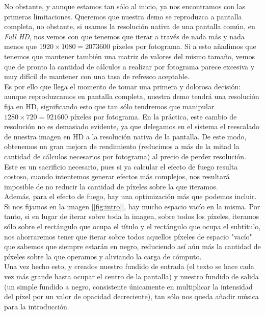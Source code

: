 No obstante, y aunque estamos tan sólo al inicio, ya nos encontramos con las primeras limitaciones. Queremos que nuestra demo se reproduzca a pantalla completa, no obstante, si usamos la resolución nativa de una pantalla común, en \emph{Full HD}, nos vemos con que tenemos que iterar a través de nada más y nada menos que \(1920 \times 1080 = 2073600\) píxeles por fotograma. Si a esto añadimos que tenemos que mantener también una matriz de valores del mismo tamaño, vemos que de pronto la cantidad de cálculos a realizar por fotograma parece excesiva y muy difícil de mantener con una tasa de refresco aceptable.\\

Es por ello que llega el momento de tomar una primera y dolorosa decisión: aunque reproduzcamos en pantalla completa, nuestra demo tendrá una resolución fija en HD, significando esto que tan sólo tendremos que manipular \(1280 \times 720 = 921600\) píxeles por fotograma. En la práctica, este cambio de resolución no es demasiado evidente, ya que delegamos en el sistema el reescalado de nuestra imagen en HD a la resolución nativa de la pantalla. De este modo, obtenemos un gran mejora de rendimiento (reducimos a más de la mitad la cantidad de cálculos necesarios por fotograma) al precio de perder resolución.\\

Este es un sacrificio necesario, pues si ya calcular el efecto de fuego resulta costoso, cuando intentemos generar efectos más complejos, nos resultará imposible de no reducir la cantidad de píxeles sobre la que iteramos.\\

Además, para el efecto de fuego, hay una optimización más que podemos incluir. Si nos fijamos en la imagen [\ref{fig:intro}], hay mucho espacio vacío en la misma. Por tanto, si en lugar de iterar sobre toda la imagen, sobre todos los píxeles, iteramos sólo sobre el rectángulo que ocupa el título y el rectángulo que ocupa el subtítulo, nos ahorraremos tener que iterar sobre todos aquellos píxeles de espacio "vacío" que sabemos que siempre estarán en negro, reduciendo así aún más la cantidad de píxeles sobre la que operamos y aliviando la carga de cómputo.\\

Una vez hecho esto, y creados nuestro fundido de entrada (el texto se hace cada vez más grande hasta ocupar el centro de la pantalla) y nuestro fundido de salida (un simple fundido a negro, consistente únicamente en multiplicar la intensidad del píxel por un valor de opacidad decreciente), tan sólo nos queda añadir música para la introducción.\\

